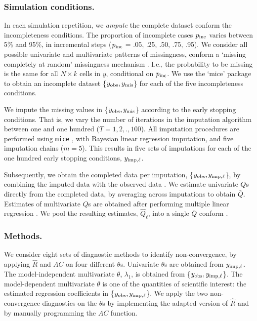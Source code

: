 \documentclass[Royal,times,sageh]{sagej}
\begin{document}
\hypertarget{simulation-conditions.}{%
\subsubsection{Simulation conditions.}\label{simulation-conditions.}}

In each simulation repetition, we \emph{ampute} the complete dataset conform the incompleteness conditions. The proportion of incomplete cases \(p_{\rm inc}\) varies between 5\% and 95\%, in incremental steps (\(p_{\rm inc}\) = .05, .25, .50, .75, .95). We consider all possible univariate and multivariate patterns of missingness, conform a `missing completely at random' missingness mechanism \citep[MCAR;][]{rubin87}. I.e., the probability to be missing is the same for all \(N \times k\) cells in \(y\), conditional on \(p_{\rm inc}\). We use the `mice' package \citep[function \texttt{mice::ampute()};][]{mice} to obtain an incomplete dataset \{\(y_{\rm obs}, y_{\rm mis}\)\} for each of the five incompleteness conditions.

We impute the missing values in \{\(y_{\rm obs}, y_{\rm mis}\)\} according to the early stopping conditions. That is, we vary the number of iterations in the imputation algorithm between one and one hundred (\(T = 1,2,.,100\)). All imputation procedures are performed using \texttt{mice} \citep[function \texttt{mice()};][]{mice}, with Bayesian linear regression imputation, and five imputation chains (\(m=5\)). This results in five sets of imputations for each of the one hundred early stopping conditions, \(y_{\rm imp, \ell}\).

Subsequently, we obtain the completed data per imputation, \{\(y_{\rm obs}, y_{\rm imp, \ell}\)\}, by combining the imputed data with the observed data \citep[function \texttt{mice::complete()};][]{mice}. We estimate univariate \(Q\)s directly from the completed data, by averaging across imputations to obtain \(\bar{Q}\). Estimates of multivariate \(Q\)s are obtained after performing multiple linear regression \citep[function \texttt{stats::lm()},][]{R}. We pool the resulting estimates, \(\hat{Q}_\ell\), into a single \(\bar{Q}\) conform \citet{vink14}.

\hypertarget{methods.}{%
\subsubsection{Methods.}\label{methods.}}

We consider eight sets of diagnostic methods to identify non-convergence, by applying \(\widehat{R}\) and \(AC\) on four different \(\theta\)s. Univariate \(\theta\)s are obtained from \(y_{\rm imp, \ell}\). The model-independent multivariate \(\theta\), \(\lambda_{1}\), is obtained from \{\(y_{\rm obs}, y_{\rm imp, \ell}\)\}. The model-dependent multivariate \(\theta\) is one of the quantities of scientific interest: the estimated regression coefficients in \{\(y_{\rm obs}, y_{\rm imp, \ell}\)\}. We apply the two non-convergence diagnostics on the \(\theta\)s by implementing the adapted version of \(\widehat{R}\) and by manually programming the \(AC\) function.
\end{document}
